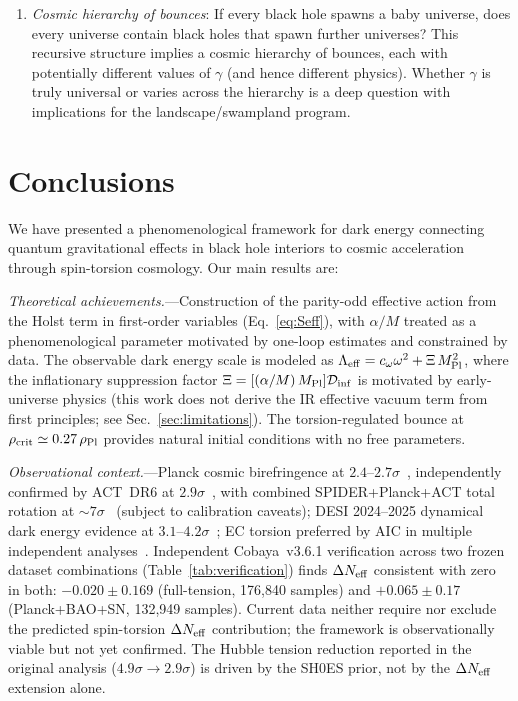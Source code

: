 \documentclass[aps,prd,twocolumn,superscriptaddress,showpacs,preprintnumbers,nofootinbib,longbibliography,floatfix]{revtex4-2}
\newcommand{\Leff}{\Lambda_{\rm eff}}
\newcommand{\Dinf}{\mathcal{D}_{\rm inf}}
\newcommand{\rhocrit}{\rho_{\rm crit}}
\newcommand{\rhoPl}{\rho_{\rm Pl}}
\newcommand{\MPl}{M_{\rm Pl}}
\newcommand{\Neff}{N_{\rm eff}}
\begin{document}
\begin{enumerate}[leftmargin=*]
\item \textit{Cosmic hierarchy of bounces}: If every black hole spawns a baby universe, does every universe contain black holes that spawn further universes? This recursive structure implies a cosmic hierarchy of bounces, each with potentially different values of $\gamma$ (and hence different physics). Whether $\gamma$ is truly universal or varies across the hierarchy is a deep question with implications for the landscape/swampland program.
\end{enumerate}


\section{Conclusions}\label{sec:conclusions}

We have presented a phenomenological framework for dark energy connecting quantum gravitational effects in black hole interiors to cosmic acceleration through spin-torsion cosmology. Our main results are:

\textit{Theoretical achievements.}---Construction of the parity-odd effective action from the Holst term in first-order variables (Eq.~\ref{eq:Seff}), with $\alpha/M$ treated as a phenomenological parameter motivated by one-loop estimates and constrained by data. The observable dark energy scale is modeled as $\Leff = c_\omega\omega^2+\Xi\,\MPl^2$, where the inflationary suppression factor $\Xi = [(\alpha/M)\,\MPl]\Dinf$ is motivated by early-universe physics (this work does not derive the IR effective vacuum term from first principles; see Sec.~\ref{sec:limitations}). The torsion-regulated bounce at $\rhocrit\simeq 0.27\,\rhoPl$ provides natural initial conditions with no free parameters.

\textit{Observational context.}---Planck cosmic birefringence at $2.4$--$2.7\sigma$~\cite{Minami2020,Eskilt2022}, independently confirmed by ACT~DR6 at $2.9\sigma$~\cite{DiegoPalazuelos2025}, with combined SPIDER+Planck+ACT total rotation at ${\sim}7\sigma$~\cite{SPIDER2025} (subject to calibration caveats); DESI 2024--2025 dynamical dark energy evidence at $3.1$--$4.2\sigma$~\cite{DESI2024,DESI2025DR2}; EC torsion preferred by AIC in multiple independent analyses~\cite{Liu2025,ECTorsionDESI2025}. Independent Cobaya~v3.6.1 verification across two frozen dataset combinations (Table~\ref{tab:verification}) finds $\Delta\Neff$ consistent with zero in both: $-0.020 \pm 0.169$ (full-tension, 176{,}840 samples) and $+0.065 \pm 0.17$ (Planck+BAO+SN, 132{,}949 samples). Current data neither require nor exclude the predicted spin-torsion $\Delta\Neff$ contribution; the framework is observationally viable but not yet confirmed. The Hubble tension reduction reported in the original analysis ($4.9\sigma \to 2.9\sigma$) is driven by the SH0ES prior, not by the $\Delta\Neff$ extension alone.
\end{document}
